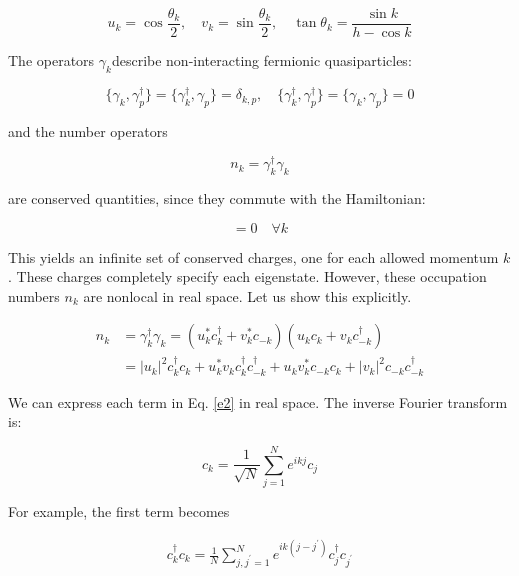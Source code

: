 \documentclass{article}
\begin{document}
\begin{equation}
u_k = \cos \frac{\theta_k}{2}, \quad v_k = \sin \frac{\theta_k}{2}, \quad \tan \theta_k = \frac{\sin k}{h - \cos k}
\end{equation}

The operators $\gamma_k$​ describe non-interacting fermionic quasiparticles:

\begin{equation}
\{ \gamma_k, \gamma^\dag_p\} = \{ \gamma^\dag_k, \gamma_p\} = \delta_{k,p}, \quad \{ \gamma^\dag_k, \gamma^\dag_p\} = \{ \gamma_k, \gamma_p\} = 0
\end{equation}

and the number operators 

\begin{equation} 
n_k = \gamma^\dagger_k \gamma_k 
\end{equation} 

are conserved quantities, since they commute with the Hamiltonian: 

\begin{equation} 
[H, n_k] = 0 \quad \forall k
\end{equation} 

This yields an infinite set of conserved charges, one for each allowed momentum $k$. These charges completely specify each eigenstate.
However, these occupation numbers $n_k$ are nonlocal in real space. Let us show this explicitly.

\begin{align} \label{e2}
n_k &= \gamma_k^\dag \gamma_k = \left( u^*_k c^\dagger_k + v^*_k c_{-k} \right) \left( u_k c_k + v_k c^\dagger_{-k} \right) \\
&= |u_k|^2 c_k^\dag c_k + u^*_k v_k c_k^\dag c^\dag_{-k} + u_k v^*_k c_{-k} c_k + |v_k|^2 c_{-k} c^\dag_{-k}
\end{align}

We can express each term in Eq. \eqref{e2} in real space. The inverse Fourier transform is:

\begin{equation}
 c_k = \frac{1}{\sqrt{N}} \sum_{j=1}^N e^{i k j} c_j
 \end{equation}
 
For example, the first term becomes

\begin{align} 
c_k^\dag c_k = \frac{1}{N} \sum_{j,j^{\prime}=1}^N e^{i k (j - j^{\prime})} c^\dag_j c_{j^{\prime}}
\end{align}
\end{document}

